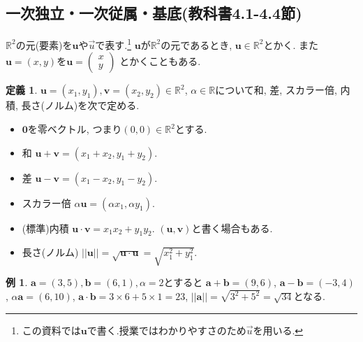 \documentclass[dvipdfmx,a4paper,11pt]{article}
\newcommand{\R}{\mathbb{R}}
\theoremstyle{definition}
\newtheorem{dfn}[thm]{定義}
\newtheorem{exa}[thm]{例}
\begin{document}
\subsection{一次独立・一次従属・基底(教科書4.1-4.4節)}
$\R^2$の元(要素)を$\bm{u}$や$\overset{\to}{u}$で表す.\footnote{この資料では$\bm{u}$で書く.授業ではわかりやすさのため$\overset{\to}{u}$を用いる. }
$\bm{u}$が$\R^2$の元であるとき, $\bm{u} \in \R^2$とかく.
また$\bm{u} = (x, y)$を$\bm{u} =   
\begin{pmatrix}
x \\
 y
 \end{pmatrix} $
 とかくこともある. 

\begin{tcolorbox}[
    colback = white,
    colframe = green!35!black,
    fonttitle = \bfseries,
    breakable = true]
    \begin{dfn}
$\bm{u}=(x_1, y_1), \bm{v}=(x_2, y_2)\in \R^2$, $\alpha \in \R$について和, 差, スカラー倍, 内積, 長さ(ノルム)を次で定める.
\begin{itemize}
	\setlength{\parskip}{0cm}
  	\setlength{\itemsep}{0pt} 
\item $\bm{0}$を零ベクトル, つまり$(0,0) \in \R^2$とする.
\item 和 $\bm{u} + \bm{v} = (x_1 + x_2, y_1+ y_2)$.
\item 差 $\bm{u} - \bm{v} = (x_1 - x_2, y_1 - y_2)$.
\item スカラー倍 $\alpha \bm{u} = (\alpha x_1, \alpha y_1)$.
\item (標準)内積 $\bm{u} \cdot\bm{v} = x_1 x_2 +  y_1 y_2 $. $(\bm{u}, \bm{v})$と書く場合もある. 
\item 長さ(ノルム) $||\bm{u}||= \sqrt{\bm{u} \cdot\bm{u}} = \sqrt{x_{1}^2 +  y_{1}^{2} }$.
\end{itemize}
    \end{dfn}
 \end{tcolorbox}
 
 \begin{exa}
$\bm{a}=(3,5), \bm{b} = (6,1), \alpha=2$とすると
$\bm{a} + \bm{b} =(9,6)$, $\bm{a} - \bm{b} =(-3,4)$, $\alpha \bm{a}= (6,10)$, 
$\bm{a} \cdot\bm{b} = 3 \times 6 + 5 \times 1 =23$, $||\bm{a}||=\sqrt{3^2 + 5^2}= \sqrt{34}$となる.
\end{exa}
\end{document}
